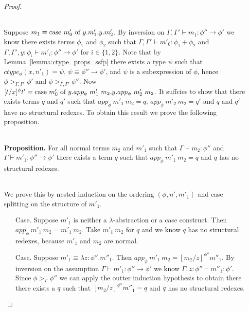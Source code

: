 \begin{proof}
\begin{itemize}
  \ \\
  Suppose $m_1 \equiv \mbox{case}\ m'_0\ \text{of}\ y\text{.}m'_1\text{,}y\text{.}m'_2$.
  By inversion on
  $\Gamma,\Gamma' \vdash m_1 : \phi'' \to \phi'$ we know there exists terms $\phi_1$ and $\phi_2$ such that
  $\Gamma,\Gamma' \vdash m'_0:\phi_1+\phi_2$ and
  $\Gamma,\Gamma',y:\phi_i \vdash m'_i:\phi'' \to \phi'$
  for $i \in \{1,2\}$.  Note that by Lemma~\ref{lemma:ctype_props_ssfp} there exists a type $\psi$ such that 
  $ctype_\phi(x, n'_1) = \psi$, $\psi \equiv \phi'' \to \phi'$, and $\psi$ is a subexpression
  of $\phi$, hence $\phi >_{\Gamma,\Gamma'} \phi'$ and $\phi >_{\Gamma,\Gamma'} \phi''$.  
  Now $[t/x]^\phi t' = \ccon{m'_0}{y}{app_\phi\ m'_1\ m_2}{app_\phi\ m'_2\ m_2}$.  It suffcies to show that
  there exists terms $q$ and $q'$ such that $app_\phi\ m'_1\ m_2 = q$, $app_\phi\ m'_2\ m_2 = q'$ and $q$ and $q'$ have
  no structural redexes.  To obtain this result we prove the following proposition.
  
  \ \\
  {\bf Proposition.}  For all normal terms $m_2$ and $m'_1$ such that  
  $\Gamma \vdash m_2 : \phi''$ and $\Gamma \vdash m'_1:\phi'' \to \phi'$
  there exists a term $q$ such that $app_\phi\ m'_1\ m_2 = q$ and $q$ has no structural redexes.
  
  \ \\
  We prove this by nested induction on the ordering $(\phi, n', m'_1)$ and case splitting on 
  the structure of $m'_1$.
  \begin{itemize}
  \item[Case.] Suppose $m'_1$ is neither a $\lambda$-abstraction or a case construct.  Then
    $app_\phi\  m'_1\ m_2 = m'_1\ m_2$.  Take $m'_1\ m_2$ for $q$ and we know $q$ has no structural
    redexes, because $m'_1$ and $m_2$ are normal.
    
  \item[Case.] Suppose $m'_1 \equiv \lambda z:\phi''.m''_1$.  Then $app_\phi\ m'_1\ m_2 = [m_2/z]^{\phi''} m''_1$.
    By inversion on the assumption $\Gamma \vdash m'_1:\phi'' \to \phi'$ we know 
    $\Gamma,z:\phi'' \vdash m''_1:\phi'$.  Since $\phi >_{\Gamma} \phi''$ we can apply the outter induction
    hypothesis to obtain there there exists a $q$ such that $[m_2/z]^{\phi''} m''_1 = q$ and 
    $q$ has no structural redexes.
    

\end{itemize}
\end{itemize}
\end{proof}
